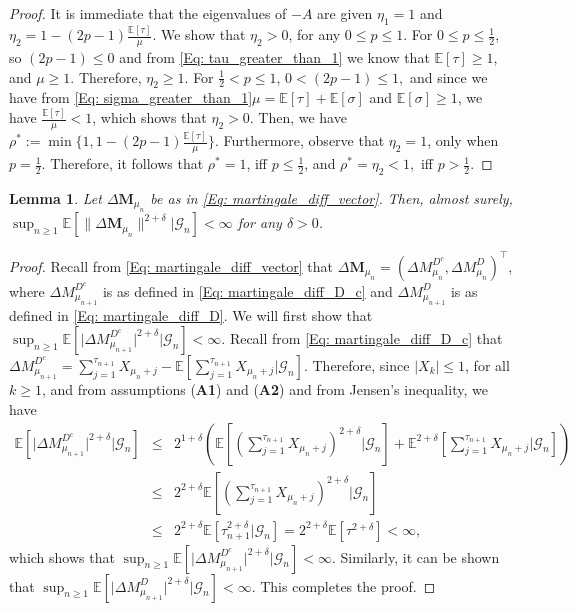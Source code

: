 \documentclass{article}
\numberwithin{equation}{section}
\newtheorem{lemma}[theorem]{Lemma}
\newcommand{\GG}{\mbox{${\mathcal G}$}}
\newcommand{\1}{\mathbf{1}}
\newcommand{\0}{\mathbf{0}}
\newcommand{\bM}{\mathbf{M}}
\newcommand{\E}{\mbox{${\mathbb E}$}}
\begin{document}
\begin{proof}
It is immediate that the eigenvalues of $-A$ are given $\eta_1=1$ and $\eta_2=1-(2p-1)\frac{\E [\tau]}{\mu}$. We show that $\eta_2>0$, for any $0 \le p \le 1$. For $0 \le p \le \frac{1}{2}$, so $(2p-1)\le 0$ and from \eqref{Eq: tau_greater_than_1} we know that $\E [\tau] \ge 1$, and $\mu \ge 1$.  Therefore, $\eta_2\ge 1$. For $\frac{1}{2}< p \le 1$, $0< (2p-1) \le 1,$ and since we have from \eqref{Eq: sigma_greater_than_1}$\mu = \E [\tau] + \E [\sigma]$ and $\E [\sigma] \ge 1$, we have $\frac{\E [\tau]}{\mu}< 1$, which shows that $\eta_2>0$. Then, we have $\rho^*:= \min\{1, 1- (2p-1)\frac{\E [\tau]}{\mu} \}$. Furthermore, observe that $\eta_2 =1$, only when $p =\frac{1}{2}$. Therefore, it follows that $\rho^* =1$, iff $p \le \frac{1}{2}$, and $\rho^*= \eta_2 <1,$ iff $p > \frac{1}{2}$.
\end{proof}
\begin{lemma}
\label{lem: martingale_difference_bounded}
Let $\Delta \bM_{ \mu_{n}}$ be as in \eqref{Eq: martingale_diff_vector}. Then, almost surely, 
$\sup_{n \ge 1} \E \left[\lVert \Delta \bM_{ \mu_{n}}\rVert ^{2+\delta} \vert \GG_n\right]<\infty$ for any $\delta>0$.
\end{lemma}
\begin{proof}
Recall from \eqref{Eq: martingale_diff_vector} that $\Delta \bM_{ \mu_{n}}=\left(\Delta M_{\mu_n}^{D^c}, \Delta M_{\mu_n}^{D}\right)^\top$, where $\Delta M_{\mu_{n+1}}^{D^c}$ is as defined in \eqref{Eq: martingale_diff_D_c} and $\Delta M_{\mu_{n+1}}^{D}$ is as defined in \eqref{Eq: martingale_diff_D}.  
We will first show that 
$\sup_{n \ge 1}\E \left[\lvert\Delta M_{\mu_{n+1}}^{D^c}\rvert ^{2+\delta}| \GG_n\right]<\infty.$ 
Recall from \eqref{Eq: martingale_diff_D_c} that 
$\Delta M_{\mu_{n+1}}^{D^c}= \sum_{j=1}^{\tau_{n+1}} X_{\mu_n +j}- \E \left[\sum_{j=1}^{\tau_{n+1}} X_{\mu_n +j} \Big | \GG_n\right]$. Therefore, since $|X_k| \le 1$, for all $k \ge 1$, and from assumptions (\textbf{A1}) and (\textbf{A2}) and from Jensen's inequality, we have 
\begin{eqnarray*}
\E \left[\lvert\Delta M_{\mu_{n+1}}^{D^c}\rvert ^{2+\delta}| \GG_n\right] & \le & 2^{1+\delta}\left(\E \left[\left(\sum_{j=1}^{\tau_{n+1}} X_{\mu_n +j}\right)^{2+\delta} \Big | \GG_n \right]+\E^{2+\delta} \left[\sum_{j=1}^{\tau_{n+1}} X_{\mu_n +j} \Big | \GG_n\right]\right)\\
& \le & 2^{2+\delta}\E \left[\left(\sum_{j=1}^{\tau_{n+1}} X_{\mu_n +j}\right)^{2+\delta} \Big | \GG_n \right]\\
& \le &  2^{2+\delta} \E \left[\tau_{n+1}^{2+\delta}\Big | \GG_n\right]
= 2^{2+\delta} \E \left[\tau^{2+\delta}\right]<\infty, 
\end{eqnarray*}
which shows that $\sup_{n \ge 1}\E \left[\lvert\Delta M_{\mu_{n+1}}^{D^c}\rvert ^{2+\delta}| \GG_n\right]< \infty$.
Similarly, it can be shown that $\sup_{n \ge 1}\E \left[\lvert\Delta M_{\mu_{n+1}}^{D}\rvert ^{2+\delta}| \GG_n\right]< \infty$. This completes the proof.
\end{proof}
\end{document}

